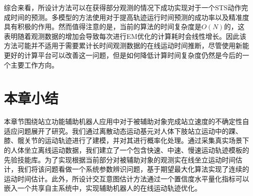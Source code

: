 综合来看，所设计方法可以在获得部分观测的情况下成功实现对于一个STS动作完成时间的预测。多模型的方法使用对于提高轨迹运行时间预测的成功率以及精准度具有积极的作用。然而值得注意的是，当前的算法的时间复杂度是$O(N)$的，这表明随着观测数据的增加会导致每次进行EM优化的计算耗时会线性增长。因此该方法可能并不适用于需要累计长时间观测数据的在线运动时间推断，尽管使用新能更好的计算平台可以改善这一问题，但是如何降低计算时间复杂度仍然是今后的一个主要工作方向。

\section{本章小结}
本章节围绕站立功能辅助机器人应用中对于被辅助对象完成站立速度的不确定性自适应问题展开了研究。我们通过离散动态运动基元对人体下肢站立运动中的踝、膝、髋关节的运动轨迹进行了建模，并对其进行概率化处理。通过采集真实场景下的人体坐立离线运动数据，我们建立了一个包含快速、中速、慢速运动轨迹模板的先验技能库。为了实现根据当前部分对被辅助对象的观测实在线坐立运动时间估计，我们将该问题看做一个系统参数辨识问题，基于期望最大化算法实现了连续的运动时间估计。此外，所设计交互意图估计方法通过一个置信度水平量化指标可以嵌入一个共享自主系统中，实现辅助机器人的在线运动轨迹优化。

